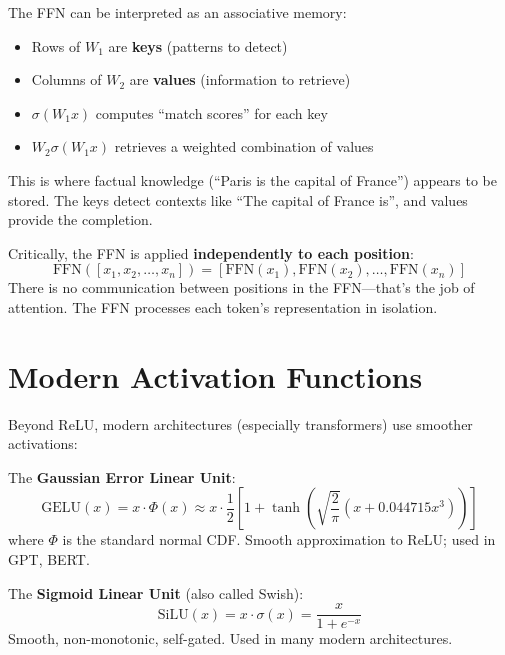 \begin{remark}
    The FFN can be interpreted as an associative memory:
    \begin{itemize}
        \item Rows of $W_1$ are \textbf{keys} (patterns to detect)
        \item Columns of $W_2$ are \textbf{values} (information to retrieve)
        \item $\sigma(W_1 x)$ computes ``match scores'' for each key
        \item $W_2 \sigma(W_1 x)$ retrieves a weighted combination of values
    \end{itemize}

    This is where factual knowledge (``Paris is the capital of France'') appears to be stored. The keys detect contexts like ``The capital of France is'', and values provide the completion.
\end{remark}

\begin{remark}
    Critically, the FFN is applied \textbf{independently to each position}:
    \[
        \text{FFN}([x_1, x_2, \ldots, x_n]) = [\text{FFN}(x_1), \text{FFN}(x_2), \ldots, \text{FFN}(x_n)]
    \]
    There is no communication between positions in the FFN---that's the job of attention. The FFN processes each token's representation in isolation.
\end{remark}

\section{Modern Activation Functions}

Beyond ReLU, modern architectures (especially transformers) use smoother activations:

\begin{definition}[GELU]
    The \textbf{Gaussian Error Linear Unit}:
    \[
        \text{GELU}(x) = x \cdot \Phi(x) \approx x \cdot \frac{1}{2}\left[1 + \tanh\left(\sqrt{\frac{2}{\pi}}(x + 0.044715 x^3)\right)\right]
    \]
    where $\Phi$ is the standard normal CDF. Smooth approximation to ReLU; used in GPT, BERT.
\end{definition}

\begin{definition}
    The \textbf{Sigmoid Linear Unit} (also called Swish):
    \[
        \text{SiLU}(x) = x \cdot \sigma(x) = \frac{x}{1 + e^{-x}}
    \]
    Smooth, non-monotonic, self-gated. Used in many modern architectures.
\end{definition}


